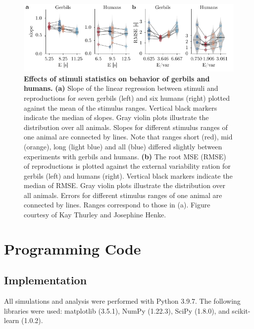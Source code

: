 \documentclass[10pt, a4paper]{article}
\begin{document}
\begin{figure}[!htb]
	\centering
	\includegraphics{figures/supp_underestimationE.pdf}
	\caption{\textbf{Effects of stimuli statistics on behavior of gerbils and humans.}
	\textbf{(a)} Slope of the linear regression between stimuli and reproductions for seven gerbils (left) and six humans (right) plotted against the mean of the stimulus ranges. Vertical black markers indicate the median of slopes. Gray violin plots illustrate the distribution over all animals. Slopes for different stimulus ranges of one animal are connected by lines. Note that ranges short (red), mid (orange), long (light blue) and all (blue) differed slightly between experiments with gerbils and humans.
	\textbf{(b)} The root MSE (RMSE) of reproductions is plotted against the external variability ration for gerbils (left) and humans (right). Vertical black markers indicate the median of RMSE. Gray violin plots illustrate the distribution over all animals. Errors for different stimulus ranges of one animal are connected by lines. Ranges correspond to those in (a). 
	Figure courtesy of Kay Thurley and Josephine Henke.
	}
\label{sup:underestimation}
\end{figure}

\pagebreak

\section*{Programming Code}
\subsection*{Implementation}
All simulations and analysis were performed with Python 3.9.7. 
The following libraries were used: matplotlib (3.5.1), NumPy (1.22.3), SciPy (1.8.0), and scikit-learn (1.0.2). 
\end{document}
